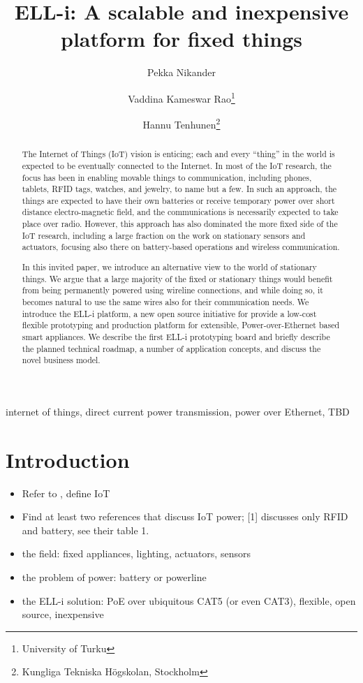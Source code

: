 \documentclass[draft,a4paper]{siamltex}
\title{{ELL-i}: A scalable and inexpensive platform for fixed things}
\author{Pekka Nikander \and Vaddina Kameswar Rao\thanks{University of Turku}
  \and Hannu Tenhunen\thanks{Kungliga Tekniska H\"{o}gskolan, Stockholm}}
\begin{document}
\maketitle

\begin{abstract}
The Internet of Things (IoT) vision is enticing; each and every
``thing'' in the world is expected to be eventually connected to the
Internet.  In most of the IoT research, the focus has been in enabling
movable things to communication, including phones, tablets, RFID tags,
watches, and jewelry, to name but a few.  In such an approach, the
things are expected to have their own batteries or receive temporary
power over short distance electro-magnetic field, and the
communications is necessarily expected to take place over radio.
However, this approach has also dominated the more fixed side of the
IoT research, including a large fraction on the work on stationary
sensors and actuators, focusing also there on battery-based operations
and wireless communication. 

In this invited paper, we introduce an alternative view to the world
of stationary things.  We argue that a large majority of the fixed or
stationary things would benefit from being permanently powered using
wireline connections, and while doing so, it becomes natural to use
the same wires also for their communication needs.  We introduce the
ELL-i platform, a new open source initiative for provide a low-cost
flexible prototyping and production platform for extensible,
Power-over-Ethernet based smart appliances.  We describe the first
ELL-i prototyping board and briefly describe the planned technical
roadmap, a number of application concepts, and discuss the novel
business model. 
\end{abstract}

\begin{keywords} 
internet of things, direct current power transmission, power over
Ethernet, TBD
\end{keywords}

\pagestyle{myheadings}
\thispagestyle{plain}


\section{Introduction}

\begin{itemize}
  \item Refer to \cite{Atzori20102787}, define IoT
  \item Find at least two references that discuss IoT power; [1]
    discusses only RFID and battery, see their table 1. 
  \item the field: fixed appliances, lighting, actuators, sensors
  \item the problem of power: battery or powerline
  \item the ELL-i solution: PoE over ubiquitous CAT5 (or even CAT3),
    flexible, open source, inexpensive 
\end{itemize}
\end{document}
